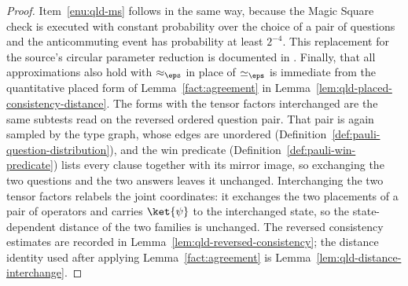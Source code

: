 \begin{proof}
	Item~\ref{enu:qld-ms} follows in the same way, because the Magic Square
	check is executed with constant probability over the choice of a pair
	of questions and the anticommuting event has probability at least
	$2^{-4}$.  This replacement for the source's circular parameter reduction
	is documented in \cite{gap:qpbt_win-implications-corrections}. Finally, that all approximations
	also hold with $\approx_\eps$ in place of $\simeq_\eps$ is immediate
	from the quantitative placed form of Lemma~\ref{fact:agreement}
	in Lemma~\ref{lem:qld-placed-consistency-distance}.
	The forms with the tensor factors interchanged are the same subtests
	read on the reversed ordered question pair. That pair is again sampled
	by the type graph, whose edges are unordered
	(Definition~\ref{def:pauli-question-distribution}), and the win
	predicate (Definition~\ref{def:pauli-win-predicate}) lists every clause
	together with its mirror image, so exchanging the two questions and the
	two answers leaves it unchanged. Interchanging the two tensor factors
	relabels the joint coordinates: it exchanges the two placements of a pair
	of operators and carries $\ket{\psi}$ to the interchanged state, so the
	state-dependent distance of the two families is unchanged.
	The reversed consistency estimates are recorded in
	Lemma~\ref{lem:qld-reversed-consistency}; the distance identity used
	after applying Lemma~\ref{fact:agreement} is
	Lemma~\ref{lem:qld-distance-interchange}.
\end{proof}

